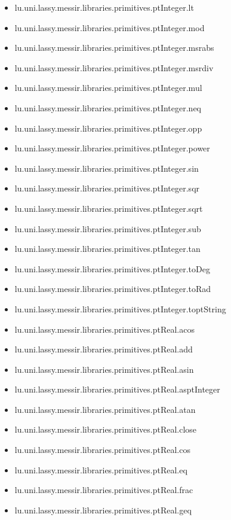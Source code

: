 \begin{itemize}
\item lu.uni.lassy.messir.libraries.primitives.ptInteger.lt 
\item lu.uni.lassy.messir.libraries.primitives.ptInteger.mod 
\item lu.uni.lassy.messir.libraries.primitives.ptInteger.msrabs 
\item lu.uni.lassy.messir.libraries.primitives.ptInteger.msrdiv 
\item lu.uni.lassy.messir.libraries.primitives.ptInteger.mul 
\item lu.uni.lassy.messir.libraries.primitives.ptInteger.neq 
\item lu.uni.lassy.messir.libraries.primitives.ptInteger.opp 
\item lu.uni.lassy.messir.libraries.primitives.ptInteger.power 
\item lu.uni.lassy.messir.libraries.primitives.ptInteger.sin 
\item lu.uni.lassy.messir.libraries.primitives.ptInteger.sqr 
\item lu.uni.lassy.messir.libraries.primitives.ptInteger.sqrt 
\item lu.uni.lassy.messir.libraries.primitives.ptInteger.sub 
\item lu.uni.lassy.messir.libraries.primitives.ptInteger.tan 
\item lu.uni.lassy.messir.libraries.primitives.ptInteger.toDeg 
\item lu.uni.lassy.messir.libraries.primitives.ptInteger.toRad 
\item lu.uni.lassy.messir.libraries.primitives.ptInteger.toptString 
\item lu.uni.lassy.messir.libraries.primitives.ptReal.acos 
\item lu.uni.lassy.messir.libraries.primitives.ptReal.add 
\item lu.uni.lassy.messir.libraries.primitives.ptReal.asin 
\item lu.uni.lassy.messir.libraries.primitives.ptReal.asptInteger 
\item lu.uni.lassy.messir.libraries.primitives.ptReal.atan 
\item lu.uni.lassy.messir.libraries.primitives.ptReal.close 
\item lu.uni.lassy.messir.libraries.primitives.ptReal.cos 
\item lu.uni.lassy.messir.libraries.primitives.ptReal.eq 
\item lu.uni.lassy.messir.libraries.primitives.ptReal.frac 
\item lu.uni.lassy.messir.libraries.primitives.ptReal.geq 

\end{itemize}
